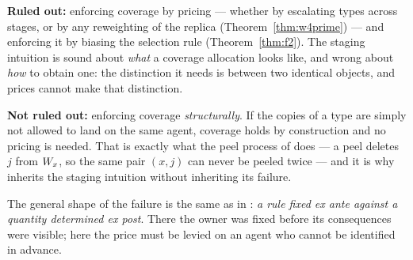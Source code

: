 \begin{remark}[Verdict]
\label{rem:w5}
\textbf{Ruled out:} enforcing coverage by pricing --- whether by escalating types
across stages, or by any reweighting of the replica
(Theorem~\ref{thm:w4prime}) --- and enforcing it by biasing the selection rule
(Theorem~\ref{thm:f2}). The staging intuition is sound about \emph{what} a
coverage allocation looks like, and wrong about \emph{how} to obtain one: the
distinction it needs is between two identical objects, and prices cannot make
that distinction.

\textbf{Not ruled out:} enforcing coverage \emph{structurally}. If the copies of
a type are simply not allowed to land on the same agent, coverage holds by
construction and no pricing is needed. That is exactly what the peel process of
 does --- a peel deletes $j$ from $W_x$, so the same
pair $(x,j)$ can never be peeled twice --- and it is why
 inherits the staging intuition without inheriting its
failure.

The general shape of the failure is the same as in :
\emph{a rule fixed ex ante against a quantity determined ex post}. There the
owner was fixed before its consequences were visible; here the price must be
levied on an agent who cannot be identified in advance.
\end{remark}
